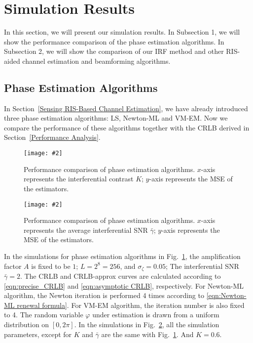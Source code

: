 \documentclass[12pt,draftclsnofoot,journal,onecolumn]{IEEEtran}
\theoremstyle{nonumberplain}
\newcommand{\myincludegraphics}[2][width=12cm]{\texttt{[image: \#2]}}
\begin{document}
\section{Simulation Results}
\label{Simulation Results}
In this section, we will present our simulation results. In Subsection 1, we will show the performance comparison of the phase estimation algorithms. In Subsection 2, we will show the comparison of our \ac{IRF} method and other RIS-aided channel estimation and beamforming algorithms. 

\subsection{Phase Estimation Algorithms} 
    In Section~\ref{Sensing RIS-Based Channel Estimation}, we have already introduced three phase estimation algorithms: LS, Newton-ML and VM-EM. Now we compare the performance of these algorithms together with the CRLB derived in Section~\ref{Performance Analysis}.  
    \begin{figure}[htbp]
        \centering
        \myincludegraphics{data/pe_K.pdf}
        \caption{Performance comparison of phase estimation algorithms. $x$-axis represents the interferential contrast $K$; $y$-axis represents the MSE of the estimators.}
        \label{fig:phase estimation_K}
    \end{figure}
    \begin{figure}[htbp]
        \centering
        \myincludegraphics{data/pe_gamma.pdf}
        \caption{Performance comparison of phase estimation algorithms. $x$-axis represents the average interferential SNR $\bar{\gamma}$; $y$-axis represents the MSE of the estimators.}
        \label{fig:phase estimation_gamma}
    \end{figure}
    In the simulations for phase estimation algorithms in Fig.~\ref{fig:phase estimation_K}, the amplification factor $A$ is fixed to be $1$; $L=2^8=256$, and $\sigma_\zeta=0.05$; The interferential SNR $\bar{\gamma}=2$. The CRLB and CRLB-approx curves are calculated according to \eqref{eqn:precise_CRLB} and \eqref{eqn:asymptotic CRLB}, respectively. For Newton-ML algorithm, the Newton iteration is performed 4 times according to \eqref{eqn:Newton-ML renewal formula}. For VM-EM algorithm, the iteration number is also fixed to 4. The random variable $\varphi$ under estimation is drawn from a uniform distribution on $[0,2\pi]$. In the simulations in Fig.~\ref{fig:phase estimation_gamma}, all the simulation parameters, except for $K$ and $\bar{\gamma}$ are the same with Fig.~\ref{fig:phase estimation_K}. And $K=0.6$.  
\end{document}
